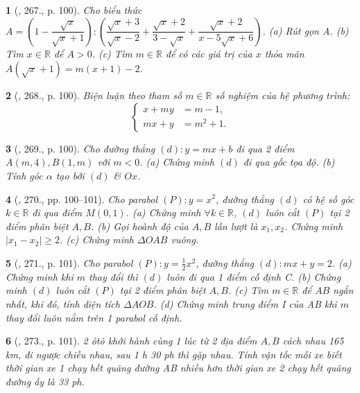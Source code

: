 \documentclass{article}
\newtheorem{baitoan}{}
\begin{document}
\begin{baitoan}[\cite{Tuyen_Toan_9_old}, 267., p. 100]
	Cho biểu thức $A = \left(1 - \dfrac{\sqrt{x}}{\sqrt{x} + 1}\right):\left(\dfrac{\sqrt{x} + 3}{\sqrt{x} - 2} + \dfrac{\sqrt{x} + 2}{3 - \sqrt{x}} + \dfrac{\sqrt{x} + 2}{x - 5\sqrt{x} + 6}\right)$. (a) Rút gọn A. (b) Tìm $x\in\mathbb{R}$ để $A > 0$. (c) Tìm $m\in\mathbb{R}$ để có các giá trị của $x$ thỏa mãn $A(\sqrt{x} + 1) = m(x + 1) - 2$.
\end{baitoan}

\begin{baitoan}[\cite{Tuyen_Toan_9_old}, 268., p. 100]
	Biện luận theo tham số $m\in\mathbb{R}$ số nghiệm của hệ phương trình:
	\begin{equation*}
		\left\{\begin{split}
			x + my &= m - 1,\\
			mx + y &= m^2 + 1.
		\end{split}\right.
	\end{equation*}
\end{baitoan}

\begin{baitoan}[\cite{Tuyen_Toan_9_old}, 269., p. 100]
	Cho đường thẳng $(d):y = mx + b$ đi qua 2 điểm $A(m,4),B(1,m)$ với $m < 0$. (a) Chứng minh $(d)$ đi qua gốc tọa độ. (b) Tính góc $\alpha$ tạo bởi $(d)$ \& $Ox$.
\end{baitoan}

\begin{baitoan}[\cite{Tuyen_Toan_9_old}, 270., pp. 100--101]
	Cho parabol $(P):y = x^2$, đường thẳng $(d)$ có hệ số góc $k\in\mathbb{R}$ đi qua điểm $M(0,1)$. (a) Chứng minh $\forall k\in\mathbb{R}$, $(d)$ luôn cắt $(P)$ tại 2 điểm phân biệt $A,B$. (b) Gọi hoành độ của $A,B$ lần lượt là $x_1,x_2$. Chứng minh $|x_1 - x_2|\ge2$. (c) Chứng minh $\Delta OAB$ vuông.
\end{baitoan}

\begin{baitoan}[\cite{Tuyen_Toan_9_old}, 271., p. 101]
	Cho parabol $(P):y = \frac{1}{2}x^2$, đường thẳng $(d):mx + y = 2$. (a) Chứng minh khi $m$ thay đổi thì $(d)$ luôn đi qua 1 điểm cố định C. (b) Chứng minh $(d)$ luôn cắt $(P)$ tại 2 điểm phân biệt $A,B$. (c) Tìm $m\in\mathbb{R}$ để $AB$ ngắn nhất, khi đó, tính diện tích $\Delta AOB$. (d) Chứng minh trung điểm I của AB khi $m$ thay đổi luôn nằm trên 1 parabol cố định.
\end{baitoan}

\begin{baitoan}[\cite{Tuyen_Toan_9_old}, 273., p. 101]
	2 ôtô khởi hành cùng 1 lúc từ 2 địa điểm $A,B$ cách nhau {\rm165 km}, đi ngược chiều nhau, sau {\rm1 h 30 ph} thì gặp nhau. Tính vận tốc mỗi xe biết thời gian xe 1 chạy hết quãng đường AB nhiều hơn thời gian xe 2 chạy hết quãng đường ấy là {\rm33 ph}.
\end{baitoan}
\end{document}
